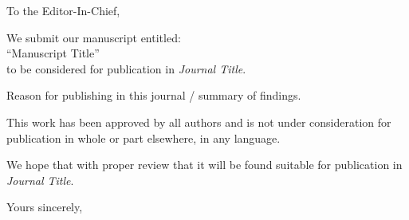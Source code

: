 \documentclass[12pt,a4paper]{letter}
\newcommand{\manuscripttitle}{Manuscript Title}
\newcommand{\journal}{Journal Title}
\newcommand{\justification}{Reason for publishing in this journal / summary of findings.}
\begin{document}
	\begin{letter}{}
		\opening{To the Editor-In-Chief,}
		\thispagestyle{fancy}

		We submit our manuscript entitled:\\``\manuscripttitle''\\to be considered for publication in \emph{\journal}.

		\justification

		This work has been approved by all authors and is not under consideration for publication in whole or part elsewhere, in any language.

		We hope that with proper review that it will be found suitable for publication in \emph{\journal}.

		\closing{Yours sincerely,}
	\end{letter}
\end{document}
